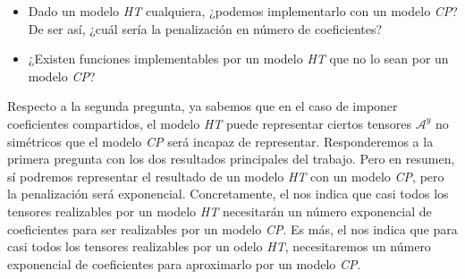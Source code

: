 \begin{itemize}
	\item Dado un modelo \textit{HT} cualquiera, ¿podemos implementarlo con un modelo \textit{CP}? De ser así, ¿cuál sería la penalización en número de coeficientes?
	\item ¿Existen funciones implementables por un modelo \textit{HT} que no lo sean por un modelo \textit{CP}?
\end{itemize}

Respecto a la segunda pregunta, ya sabemos que en el caso de imponer coeficientes compartidos, el modelo \textit{HT} puede representar ciertos tensores $\mathcal{A}^y$ no simétricos que el modelo \textit{CP} será incapaz de representar. Responderemos a la primera pregunta con los dos resultados principales del trabajo. Pero en resumen, sí podremos representar el resultado de un modelo \textit{HT} con un modelo \textit{CP}, pero la penalización será exponencial. Concretamente, el  nos indica que casi todos los tensores realizables por un modelo \textit{HT} necesitarán un número exponencial de coeficientes para ser realizables por un modelo \textit{CP}. Es más, el  nos indica que para casi todos los tensores realizables por un odelo \textit{HT}, necesitaremos un número exponencial de coeficientes para aproximarlo por un modelo \textit{CP}.
